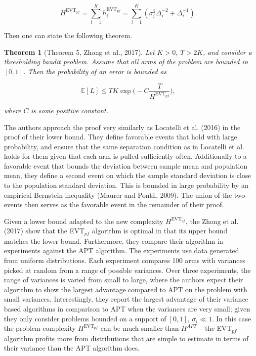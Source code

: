 \documentclass[11pt,]{article}
\newtheorem{theorem}{Theorem}
\begin{document}
\[
H^{\text{EVT}_{pf}} = \sum_{i=1}^K h_i^{\text{EVT}_{pf}} = \sum_{i=1}^K (\sigma_i^2\Delta_i^{-2} + \Delta_i^{-1}).
\]

Then one can state the following theorem.

\begin{theorem}[Theorem 5, Zhong et al., 2017] 
\label{theorem:ZhongEtAl2017Theorem5}
Let $K > 0$, $T > 2K$, and consider a thresholding bandit problem. Assume that all arms of the problem are bounded in $[0,1]$. Then the probability of an error is bounded as

\begin{equation*}
\mathbb{E}[L] \leq TK \exp\Big(-C\frac{T}{H^{\text{EVT}_{pf}}}\Big),
\end{equation*}

where $C$ is some positive constant.
\end{theorem}

The authors approach the proof very similarly as Locatelli et al. (2016)
in the proof of their lower bound. They define favorable events that
hold with large probability, and ensure that the same separation
condition as in Locatelli et al. holds for them given that each arm is
pulled sufficiently often. Additionally to a favorable event that bounds
the deviation between sample mean and population mean, they define a
second event on which the sample standard deviation is close to the
population standard deviation. This is bounded in large probability by
an empirical Bernstein inequality (Maurer and Pontil, 2009). The union
of the two events then serves as the favorable event in the remainder of
their proof.

Given a lower bound adapted to the new complexity
\(H^{\text{EVT}_{pf}}\), the Zhong et al. (2017) show that the
EVT\(_{pf}\) algorithm is optimal in that its upper bound matches the
lower bound. Furthermore, they compare their algorithm in experiments
against the APT algorithm. The experiments use data generated from
uniform distributions. Each experiment compares 100 arms with variances
picked at random from a range of possible variances. Over three
experiments, the range of variances is varied from small to large, where
the authors expect their algorithm to show the largest advantage
compared to APT on the problem with small variances. Interestingly, they
report the largest advantage of their variance based algorithms in
comparison to APT when the variances are very small; given they only
consider problems bounded on a support of \([0,1]\), \(\sigma_i \ll 1\).
In this case the problem complexity \(H^{\text{EVT}_{pf}}\) can be much
smaller than \(H^{APT}\) -- the EVT\(_{pf}\) algorithm profits more from
distributions that are simple to estimate in terms of their variance
than the APT algorithm does.
\end{document}
